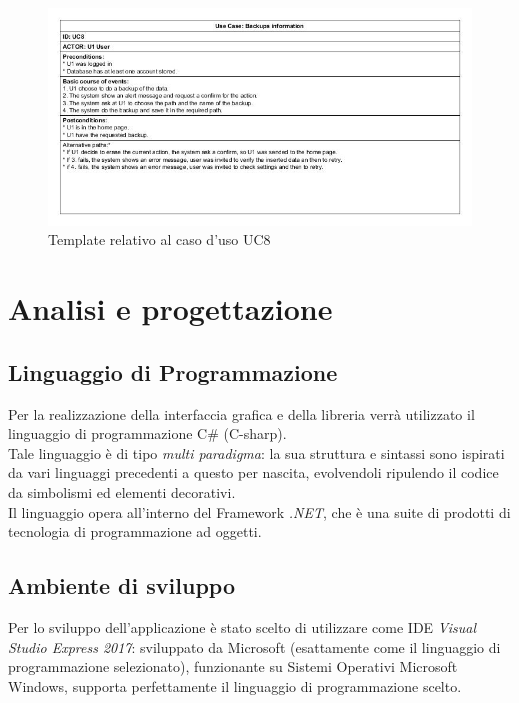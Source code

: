 \documentclass[a4paper,10pt]{report}
\begin{document}
			\begin{figure}[htbp]
				\centering
				\includegraphics[width = \textwidth]{immagini/USE_CASE_TEMPLATE/UC08.jpg}
				\caption{Template relativo al caso d'uso UC8}
				\end{figure}
\newpage
\chapter{Analisi e progettazione}
	\section{Linguaggio di Programmazione}
		Per la realizzazione della interfaccia grafica e della libreria verrà
			utilizzato il linguaggio di programmazione C\# (C-sharp).\\
			Tale linguaggio è di tipo {\itshape multi paradigma}: la sua struttura e
			sintassi sono ispirati da vari linguaggi precedenti a questo per nascita,
			evolvendoli ripulendo il codice da simbolismi ed elementi decorativi.\\
			Il linguaggio opera all'interno del Framework {\itshape .NET}, che è una
			suite di prodotti di tecnologia di programmazione ad oggetti.
	\section{Ambiente di sviluppo}
		Per lo sviluppo dell'applicazione è stato scelto di utilizzare come IDE
			{\itshape Visual Studio Express 2017}: sviluppato da Microsoft
			(esattamente come il linguaggio di programmazione selezionato),
			funzionante su Sistemi Operativi Microsoft Windows, supporta
			perfettamente il linguaggio di programmazione scelto.
\end{document}
